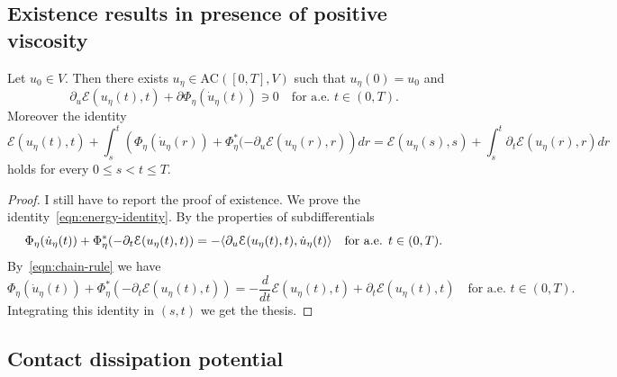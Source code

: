 \subsection{Existence results in presence of positive viscosity}

\begin{prop}
Let $u_0\in V$. Then there exists $u_\eta\in\text{AC}([0,T],V)$ such that $u_\eta(0)=u_0$ and
\begin{equation*}
\partial_u\mathcal{E}(u_\eta(t),t)+\partial\Phi_\eta(\dot u_\eta(t))\ni0\quad\text{for a.e. $t\in(0,T)$}.
\end{equation*}
Moreover the identity
\begin{equation}
\label{eqn:energy-identity}
\mathcal{E}(u_\eta(t),t)+\int_s^t\left(\Phi_\eta(\dot u_\eta(r))+\Phi_\eta^*(-\partial_u\mathcal{E}(u_\eta(r),r)\right)dr=\mathcal{E}(u_\eta(s),s)+\int_s^t\partial_t\mathcal{E}(u_\eta(r),r)dr
\end{equation}
holds for every $0\le s<t\le T$.
\end{prop}
\begin{proof}
I still have to report the proof of existence. We prove the identity~\eqref{eqn:energy-identity}. By the properties of subdifferentials
\begin{equation*}
\Phi_\eta(\dot u_\eta(t))+\Phi_\eta^*(-\partial_t\mathcal{E}(u_\eta(t),t))=-\langle\partial_u\mathcal{E}(u_\eta(t),t),\dot u_\eta(t)\rangle\quad\text{for a.e. $t\in(0,T)$}.
\end{equation*}
By~\eqref{eqn:chain-rule} we have
\begin{equation*}
\Phi_\eta(\dot u_\eta(t))+\Phi_\eta^*(-\partial_t\mathcal{E}(u_\eta(t),t))=-\frac{d}{dt}\mathcal{E}(u_\eta(t),t)+\partial_t\mathcal{E}(u_\eta(t),t)\quad\text{for a.e. $t\in(0,T)$}.
\end{equation*}
Integrating this identity in $(s,t)$ we get the thesis.
\end{proof}

\subsection{Contact dissipation potential}

